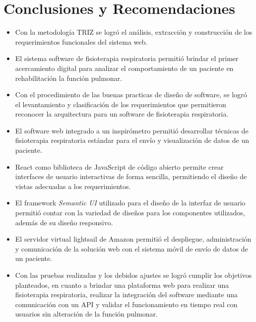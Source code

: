 \documentclass[12pt]{article}
\begin{document}
\section{Conclusiones y Recomendaciones}
\begin{itemize}
    \item Con la metodología TRIZ se logró el análisis, extracción y construcción de los requerimientos funcionales del sistema web.  
    
    \item El sistema software de fisioterapia respiratoria permitió brindar el primer acercamiento digital para analizar el comportamiento de un paciente en rehabilitación la función pulmonar.
    
    \item Con el procedimiento de las buenas practicas de diseño de software, se logró el levantamiento y clasificación de los requerimientos que permitieron reconocer la arquitectura para un software de fisioterapia respiratoria.

    \item El software web integrado a un inspirómetro permitió desarrollar técnicas de fisioterapia  respiratoria estándar para el envío y visualización de datos de un paciente.
    
    \item React como biblioteca de JavaScript de código abierto permite crear interfaces de usuario interactivas de forma sencilla, permitiendo el diseño de vistas adecuadas a los requerimientos.
    
    \item El framework \textit{Semantic UI} utilizado para el diseño de la interfaz de usuario permitió contar con la variedad de diseños para los componentes utilizados, además de su diseño responsivo. 
    
    \item El servidor virtual lightsail de Amazon permitió el despliegue, administración y comunicación de la solución web con el sistema móvil de envío de datos de un paciente.
    
    \item Con las pruebas realizadas y los debidos ajustes se logró cumplir los objetivos planteados, en cuanto a brindar una plataforma web para realizar una fisioterapia respiratoria, realizar la integración del software mediante una comunicación con un API y validar el funcionamiento en tiempo real con usuarios sin alteración de la función pulmonar. 
    

\end{itemize}
\end{document}
